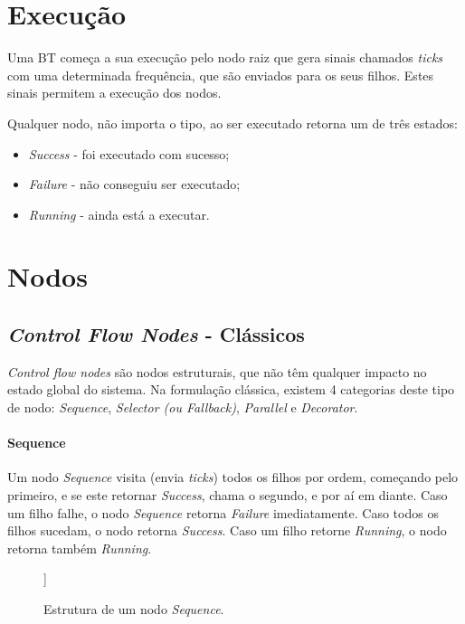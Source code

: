 \section{Execução}
Uma BT começa a sua execução pelo nodo raiz que gera sinais chamados \textit{ticks} com uma determinada frequência, que são enviados para os seus filhos.
Estes sinais permitem a execução dos nodos.

Qualquer nodo, não importa o tipo, ao ser executado retorna um de três estados: 
\begin{itemize}
    \item \textit{Success} - foi executado com sucesso;
    \item \textit{Failure} - não conseguiu ser executado;
    \item \textit{Running} - ainda está a executar.
\end{itemize}




\section{Nodos}

\subsection{\textit{Control Flow Nodes} - Clássicos}
\textit{Control flow nodes} são nodos estruturais, que não têm qualquer impacto no estado global do sistema.
Na formulação clássica, existem 4 categorias deste tipo de nodo: \textit{Sequence}, \textit{Selector (ou Fallback)}, \textit{Parallel} e \textit{Decorator}.

\paragraph{Sequence}{
    Um nodo \textit{Sequence} visita (envia \textit{ticks}) todos os filhos por ordem, começando pelo primeiro, e se este retornar \textit{Success}, chama o segundo, e por aí em diante.
    Caso um filho falhe, o nodo \textit{Sequence} retorna \textit{Failure} imediatamente.
    Caso todos os filhos sucedam, o nodo retorna \textit{Success}.
    Caso um filho retorne \textit{Running}, o nodo retorna também \textit{Running}.

    \begin{figure}[H]
    \centering
    \begin{behavior}
        [\sequence
            [\action{Child 1}]
            [\action{Child 2}]
            [{\textbf{. . .}}, inner sep=10pt]
            [\action{Child N}]
        ]
    \end{behavior}
    \caption{Estrutura de um nodo \textit{Sequence}.}
    \label{fig:2.2}
    \end{figure}
}

